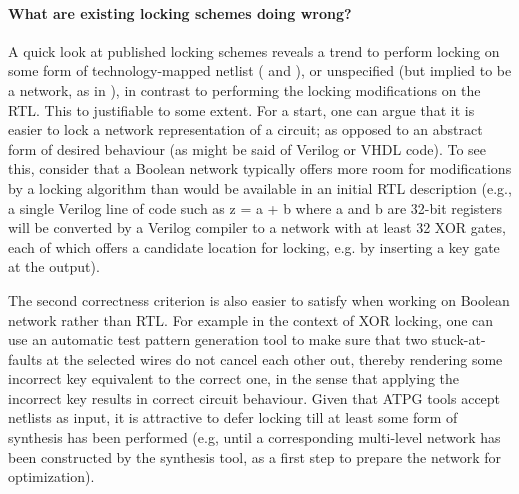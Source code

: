 
\paragraph{What are existing locking schemes doing wrong?} A quick look at published locking schemes reveals a trend to perform locking on some form of technology-mapped netlist (\cite{} and \cite{}), or unspecified (but implied to be a network, as in \cite{}), in contrast to performing the locking modifications on the RTL. This to justifiable to some extent. For a start, one can argue that it is easier to lock a network representation of a circuit; as opposed to an abstract form of desired behaviour (as might be said of Verilog or VHDL code). To see this, consider that a Boolean network typically offers more room for modifications by a locking algorithm than would be available in an initial RTL description (e.g., a single Verilog line of code such as z = a + b where a and b are 32-bit registers will be converted by a Verilog compiler to a network with at least 32 XOR gates, each of which offers a candidate location for locking, e.g. by inserting a key gate at the output). 

The second correctness criterion is also easier to satisfy when working on Boolean network rather than RTL. For example in the context of XOR locking, one can use an automatic test pattern generation tool to make sure that two stuck-at-faults at the selected wires do not cancel each other out, thereby rendering some incorrect key equivalent to the correct one, in the sense that applying the incorrect key results in correct circuit behaviour. Given that ATPG tools accept netlists as input, it is attractive to defer locking till at least some form of synthesis has been performed (e.g, until a corresponding multi-level network has been constructed by the synthesis tool, as a first step to prepare the network for optimization).

